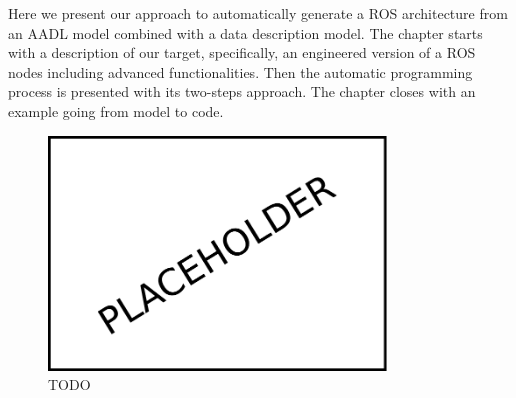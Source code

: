 Here we present our approach to automatically generate a ROS architecture from an AADL model combined with a data description model. The chapter starts with a description of our target, specifically, an engineered version of a ROS nodes including advanced functionalities. Then the automatic programming process is presented with its two-steps approach. The chapter closes with an example going from model to code.

\minitoc
\newpage

\begin{figure}[t]
    \centering
    \includegraphics[width=0.8\textwidth]{gfx/placeholder}
    \caption{TODO}\label{fig:code-gen}
\end{figure}


